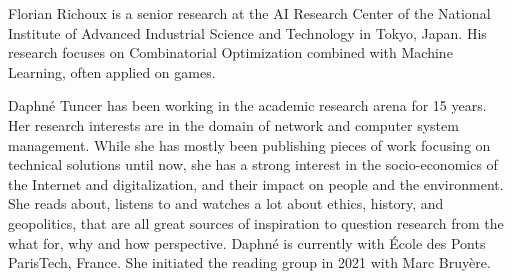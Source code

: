 \documentclass[journal]{IEEEtran}
\begin{document}
\begin{IEEEbiographynophoto}{Florian Richoux}
  is  a senior  research at  the AI  Research Center  of the  National
  Institute of  Advanced Industrial  Science and Technology  in Tokyo,
  Japan.  His research focuses  on Combinatorial Optimization combined
  with Machine Learning, often applied on games.


\end{IEEEbiographynophoto}

\begin{IEEEbiographynophoto}{Daphné Tuncer}
  has been working  in the academic research arena for  15 years.  Her
  research interests are in the  domain of network and computer system
  management.  While she  has mostly  been publishing  pieces of  work
  focusing on technical solutions until now, she has a strong interest
  in the socio-economics of the Internet and digitalization, and their
  impact on  people and the  environment. She reads about,  listens to
  and watches a  lot about ethics, history, and  geopolitics, that are
  all great sources of inspiration  to question research from the what
  for, why  and how perspective.   Daphné is currently with  École des
  Ponts ParisTech,  France. She  initiated the  reading group  in 2021
  with Marc Bruyère.
\end{IEEEbiographynophoto}
\end{document}
